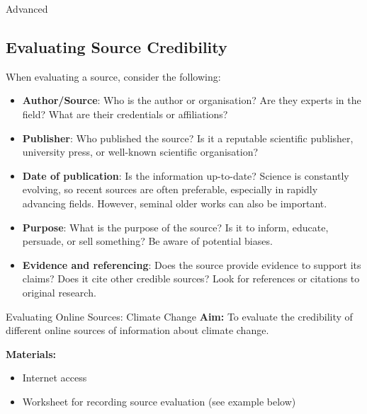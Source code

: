 \begin{tieredquestions}{Advanced}
\subsection{Evaluating Source Credibility}

When evaluating a source, consider the following:

\begin{itemize}
    \item \textbf{Author/Source}: Who is the author or organisation? Are they experts in the field? What are their credentials or affiliations?
    \item \textbf{Publisher}: Who published the source? Is it a reputable scientific publisher, university press, or well-known scientific organisation?
    \item \textbf{Date of publication}: Is the information up-to-date? Science is constantly evolving, so recent sources are often preferable, especially in rapidly advancing fields. However, seminal older works can also be important.
    \item \textbf{Purpose}: What is the purpose of the source? Is it to inform, educate, persuade, or sell something? Be aware of potential biases.
    \item \textbf{Evidence and referencing}: Does the source provide evidence to support its claims? Does it cite other credible sources?  Look for references or citations to original research.
    \end{itemize}

\begin{investigation}{Evaluating Online Sources: Climate Change}
\textbf{Aim:} To evaluate the credibility of different online sources of information about climate change.

\textbf{Materials:}
\begin{itemize}
    \item Internet access
    \item Worksheet for recording source evaluation (see example below)
\end{itemize}


\end{investigation}
\end{tieredquestions}
